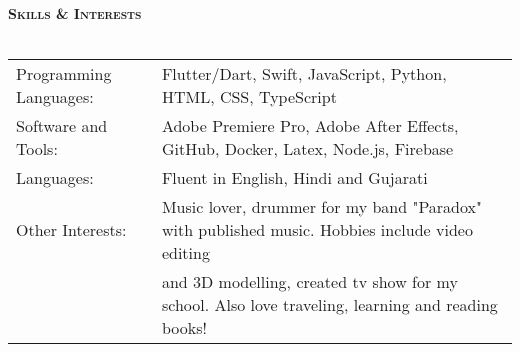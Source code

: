 \documentclass[a4paper]{article}
\newcommand{\lineunder} {
    \vspace*{-8pt} \\
    \hspace*{-10pt} \hrulefill \\
}
\newcommand{\header} [1] {
    {\hspace*{-10pt}\vspace*{6pt} \large\textsc{\textbf{#1}}}
    \vspace*{-6pt} \lineunder
}
\begin{document}
\vspace*{1mm}
\header{Skills \& Interests}
\begin{tabular}{ l l }
	Programming Languages: & Flutter/Dart, Swift, JavaScript, Python, HTML, CSS, TypeScript     \\
	Software and Tools:    & Adobe Premiere Pro, Adobe After Effects, GitHub, Docker, Latex, Node.js, Firebase \\
    Languages:    & Fluent in English, Hindi and Gujarati \\
    Other Interests:    & Music lover, drummer for my band "Paradox" with published music. Hobbies include video editing \\
                        & and 3D modelling, created tv show for my school. Also love traveling, learning and reading books! \\
\end{tabular}

\vspace*{-80pt}
\end{document}
